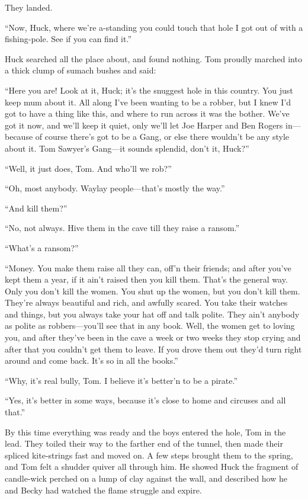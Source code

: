 \documentclass{book}
\begin{document}
They landed.

“Now, Huck, where we’re a-standing you could touch that hole I got out of with a fishing-pole. See if you can find it.”

Huck searched all the place about, and found nothing. Tom proudly marched into a thick clump of sumach bushes and said:

“Here you are! Look at it, Huck; it’s the snuggest hole in this country. You just keep mum about it. All along I’ve been wanting to be a robber, but I knew I’d got to have a thing like this, and where to run across it was the bother. We’ve got it now, and we’ll keep it quiet, only we’ll let Joe Harper and Ben Rogers in—because of course there’s got to be a Gang, or else there wouldn’t be any style about it. Tom Sawyer’s Gang—it sounds splendid, don’t it, Huck?”

“Well, it just does, Tom. And who’ll we rob?”

“Oh, most anybody. Waylay people—that’s mostly the way.”

“And kill them?”

“No, not always. Hive them in the cave till they raise a ransom.”

“What’s a ransom?”

“Money. You make them raise all they can, off’n their friends; and after you’ve kept them a year, if it ain’t raised then you kill them. That’s the general way. Only you don’t kill the women. You shut up the women, but you don’t kill them. They’re always beautiful and rich, and awfully scared. You take their watches and things, but you always take your hat off and talk polite. They ain’t anybody as polite as robbers—you’ll see that in any book. Well, the women get to loving you, and after they’ve been in the cave a week or two weeks they stop crying and after that you couldn’t get them to leave. If you drove them out they’d turn right around and come back. It’s so in all the books.”

“Why, it’s real bully, Tom. I believe it’s better’n to be a pirate.”

“Yes, it’s better in some ways, because it’s close to home and circuses and all that.”

By this time everything was ready and the boys entered the hole, Tom in the lead. They toiled their way to the farther end of the tunnel, then made their spliced kite-strings fast and moved on. A few steps brought them to the spring, and Tom felt a shudder quiver all through him. He showed Huck the fragment of candle-wick perched on a lump of clay against the wall, and described how he and Becky had watched the flame struggle and expire.
\end{document}

